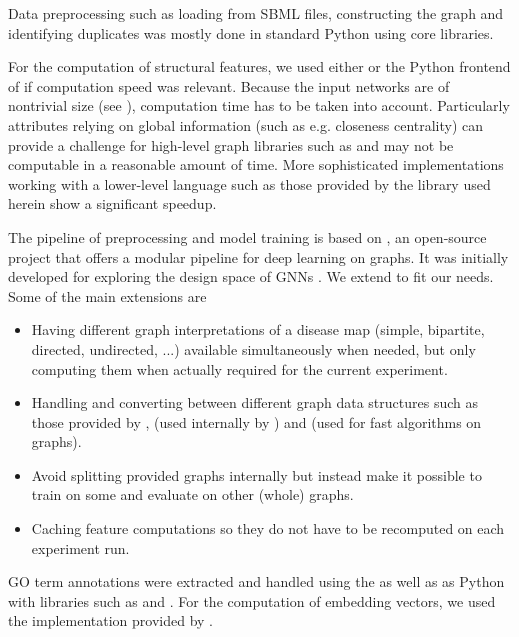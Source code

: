 \documentclass[
	fontsize=10pt, %
	twoside=false, %
	secnumdepth=1, %
  toc=indentunnumbered %
]{kaobook}
\begin{document}
Data preprocessing such as loading from SBML files, constructing the graph and
identifying duplicates was mostly done in standard Python using core libraries.

For the computation of structural features, we used either 
\cite{hagberg_ExploringNetworkStructure_2008}
or the Python frontend of 
\cite{csardi_IgraphSoftwarePackage_}
if computation speed was relevant.
Because the input networks are of nontrivial size (see ),
computation time has to be taken into account.
Particularly attributes relying on global information (such as e.g. closeness
centrality) can provide a challenge for high-level graph libraries such as
 and may not be computable in a reasonable amount of time. More
sophisticated implementations working with a lower-level language such as those
provided by the  library used herein show a significant speedup.

The pipeline of preprocessing and model training is based on 
\cite{noauthor_snap-stanfordgraphgym_2021}, an open-source project that offers a
modular pipeline for deep learning on graphs. It was initially developed for
exploring the design space of GNNs \cite{you_design_2020}. We extend
 to fit our needs. Some of the main extensions are
\begin{itemize}
\item Having different graph interpretations of a disease map (simple,
  bipartite, directed, undirected, ...) available simultaneously when needed,
  but only computing them when actually required for the current experiment.
\item Handling and converting between different graph data structures such as
  those provided by ,  (used internally by
  ) and  (used for fast algorithms on graphs).
\item Avoid splitting provided graphs internally but instead make it possible to
  train on some and evaluate on other (whole) graphs.
\item Caching feature computations so they do not have to be recomputed on each
  experiment run.
\end{itemize}

GO term annotations were extracted and handled using the 
\cite{gesellschaftfurklassifikation_DataAnalysisMachine_2008}
as well as as Python with libraries such as
\cite{reback_PandasdevPandasPandas_2021}
and 
\cite{harris_ArrayProgrammingNumPy_2020}. For the computation of embedding
vectors, we used the  implementation provided by .
\end{document}
